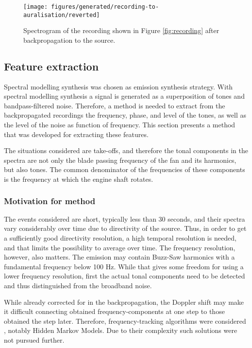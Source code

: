 \documentclass[10pt,twocolumn]{article}
\begin{document}
\begin{figure}[H]
  \centering
  \texttt{[image: figures/generated/recording-to-auralisation/reverted]}
  \caption{Spectrogram of the recording shown in Figure \ref{fig:recording} after backpropagation to the source.}
  \label{fig:backpropagated}
\end{figure}

\subsection{Feature extraction}\label{sec:tool:emission:features}
Spectral modelling synthesis was chosen as emission synthesis strategy. With
spectral modelling synthesis a signal is generated as a superposition of tones
and bandpass-filtered noise.
Therefore, a method is needed to extract from the backpropagated recordings the
frequency, phase, and level of the tones, as well as the level of the noise as
function of frequency. This section presents a method that was developed for
extracting these features.

The situations considered are take-offs, and therefore the tonal components in
the spectra are not only the blade passing frequency of the fan and its
harmonics, but also  tones. The common denominator of the
frequencies of these components is the frequency at which the engine shaft
rotates.

\subsubsection{Motivation for method}
The events considered are short, typically less than 30 seconds, and their
spectra vary considerably over time due to directivity of the source. Thus, in
order to get a sufficiently good directivity resolution, a high temporal
resolution is needed, and that limits the possibility to average over time. The
frequency resolution, however, also matters. The emission may contain Buzz-Saw
harmonics with a fundamental frequency below 100 Hz. While that gives some
freedom for using a lower frequency resolution, first the actual tonal
components need to be detected and thus distinguished from the broadband noise.

While already corrected for in the backpropagation, the Doppler shift may make
it difficult connecting obtained frequency-components at one step to those
obtained the step later. Therefore, frequency-tracking algorithms were
considered \cite{Lampert2010}, notably Hidden Markov Models. Due to their
complexity such solutions were not pursued further.
\end{document}
